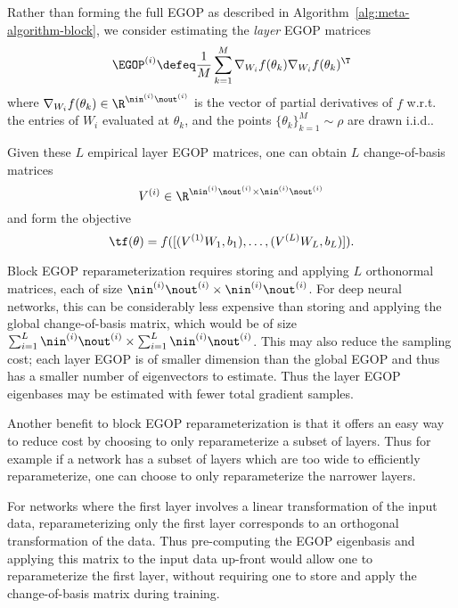 Rather than forming the full EGOP as described in Algorithm~\ref{alg:meta-algorithm-block}, we consider estimating the \textit{layer} EGOP matrices%
\[
    \EGOP^{(i)} \defeq \frac{1}{M}\sum_{k=1}^M \nabla_{W_i} f(\theta_k)\nabla_{W_i} f(\theta_k)^\T
\]
where $\nabla_{W_i} f(\theta_k) \in \R^{\nin^{(i)}\nout^{(i)}}$ is the vector of partial derivatives of $f$ w.r.t. the entries of $W_i$ evaluated at $\theta_k$, and the points $\{\theta_k\}_{k=1}^M \sim \rho$ are drawn i.i.d.. 

Given these $L$ empirical layer EGOP matrices, one can obtain $L$ change-of-basis matrices 
\[
    V^{(i)}\in \R^{\nin^{(i)}\nout^{(i)}\times \nin^{(i)}\nout^{(i)}}
\]
and form the objective
\[
    \tf(\theta) = f([(V^{(1)}W_1, b_1),\dots,(V^{(L)}W_L, b_L)]).
\]

Block EGOP reparameterization requires storing and applying $L$ orthonormal matrices, each of size $\nin^{(i)}\nout^{(i)}\times \nin^{(i)}\nout^{(i)}$. For deep neural networks, this can be considerably less expensive than storing and applying the global change-of-basis matrix, which would be of size $\sum_{i=1}^L \nin^{(i)}\nout^{(i)}\times \sum_{i=1}^L \nin^{(i)}\nout^{(i)}$. This may also reduce the sampling cost; each layer EGOP is of smaller dimension than the global EGOP and thus has a smaller number of eigenvectors to estimate. Thus the layer EGOP eigenbases may be estimated with fewer total gradient samples.

Another benefit to block EGOP reparameterization is that it offers an easy way to reduce cost by choosing to only reparameterize a subset of layers. Thus for example if a network has a subset of layers which are too wide to efficiently reparameterize, one can choose to only reparameterize the narrower layers. 

For networks where the first layer involves a linear transformation of the input data, reparameterizing only the first layer corresponds to an orthogonal transformation of the data. Thus pre-computing the EGOP eigenbasis and applying this matrix to the input data up-front would allow one to reparameterize the first layer, without requiring one to store and apply the change-of-basis matrix during training.